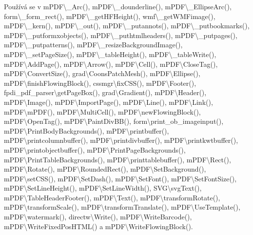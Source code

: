 Používá se v m\-P\-D\-F\textbackslash{}\-\_\-\-Arc(), m\-P\-D\-F\textbackslash{}\-\_\-dounderline(), m\-P\-D\-F\textbackslash{}\-\_\-\-Ellipse\-Arc(), form\textbackslash{}\-\_\-form\-\_\-rect(), m\-P\-D\-F\textbackslash{}\-\_\-get\-H\-F\-Height(), wmf\textbackslash{}\-\_\-get\-W\-M\-Fimage(), m\-P\-D\-F\textbackslash{}\-\_\-kern(), m\-P\-D\-F\textbackslash{}\-\_\-out(), m\-P\-D\-F\textbackslash{}\-\_\-putannots(), m\-P\-D\-F\textbackslash{}\-\_\-putbookmarks(), m\-P\-D\-F\textbackslash{}\-\_\-putformxobjects(), m\-P\-D\-F\textbackslash{}\-\_\-puthtmlheaders(), m\-P\-D\-F\textbackslash{}\-\_\-putpages(), m\-P\-D\-F\textbackslash{}\-\_\-putpatterns(), m\-P\-D\-F\textbackslash{}\-\_\-resize\-Background\-Image(), m\-P\-D\-F\textbackslash{}\-\_\-set\-Page\-Size(), m\-P\-D\-F\textbackslash{}\-\_\-table\-Height(), m\-P\-D\-F\textbackslash{}\-\_\-table\-Write(), m\-P\-D\-F\textbackslash{}\-Add\-Page(), m\-P\-D\-F\textbackslash{}\-Arrow(), m\-P\-D\-F\textbackslash{}\-Cell(), m\-P\-D\-F\textbackslash{}\-Close\-Tag(), m\-P\-D\-F\textbackslash{}\-Convert\-Size(), grad\textbackslash{}\-Coons\-Patch\-Mesh(), m\-P\-D\-F\textbackslash{}\-Ellipse(), m\-P\-D\-F\textbackslash{}finish\-Flowing\-Block(), cssmgr\textbackslash{}fix\-C\-S\-S(), m\-P\-D\-F\textbackslash{}\-Footer(), fpdi\-\_\-pdf\-\_\-parser\textbackslash{}get\-Page\-Box(), grad\textbackslash{}\-Gradient(), m\-P\-D\-F\textbackslash{}\-Header(), m\-P\-D\-F\textbackslash{}\-Image(), m\-P\-D\-F\textbackslash{}\-Import\-Page(), m\-P\-D\-F\textbackslash{}\-Line(), m\-P\-D\-F\textbackslash{}\-Link(), m\-P\-D\-F\textbackslash{}m\-P\-D\-F(), m\-P\-D\-F\textbackslash{}\-Multi\-Cell(), m\-P\-D\-F\textbackslash{}new\-Flowing\-Block(), m\-P\-D\-F\textbackslash{}\-Open\-Tag(), m\-P\-D\-F\textbackslash{}\-Paint\-Div\-B\-B(), form\textbackslash{}print\-\_\-ob\-\_\-imageinput(), m\-P\-D\-F\textbackslash{}\-Print\-Body\-Backgrounds(), m\-P\-D\-F\textbackslash{}printbuffer(), m\-P\-D\-F\textbackslash{}printcolumnbuffer(), m\-P\-D\-F\textbackslash{}printdivbuffer(), m\-P\-D\-F\textbackslash{}printkwtbuffer(), m\-P\-D\-F\textbackslash{}printobjectbuffer(), m\-P\-D\-F\textbackslash{}\-Print\-Page\-Backgrounds(), m\-P\-D\-F\textbackslash{}\-Print\-Table\-Backgrounds(), m\-P\-D\-F\textbackslash{}printtablebuffer(), m\-P\-D\-F\textbackslash{}\-Rect(), m\-P\-D\-F\textbackslash{}\-Rotate(), m\-P\-D\-F\textbackslash{}\-Rounded\-Rect(), m\-P\-D\-F\textbackslash{}\-Set\-Background(), m\-P\-D\-F\textbackslash{}set\-C\-S\-S(), m\-P\-D\-F\textbackslash{}\-Set\-Dash(), m\-P\-D\-F\textbackslash{}\-Set\-Font(), m\-P\-D\-F\textbackslash{}\-Set\-Font\-Size(), m\-P\-D\-F\textbackslash{}\-Set\-Line\-Height(), m\-P\-D\-F\textbackslash{}\-Set\-Line\-Width(), S\-V\-G\textbackslash{}svg\-Text(), m\-P\-D\-F\textbackslash{}\-Table\-Header\-Footer(), m\-P\-D\-F\textbackslash{}\-Text(), m\-P\-D\-F\textbackslash{}transform\-Rotate(), m\-P\-D\-F\textbackslash{}transform\-Scale(), m\-P\-D\-F\textbackslash{}transform\-Translate(), m\-P\-D\-F\textbackslash{}\-Use\-Template(), m\-P\-D\-F\textbackslash{}watermark(), directw\textbackslash{}\-Write(), m\-P\-D\-F\textbackslash{}\-Write\-Barcode(), m\-P\-D\-F\textbackslash{}\-Write\-Fixed\-Pos\-H\-T\-M\-L() a m\-P\-D\-F\textbackslash{}\-Write\-Flowing\-Block().

